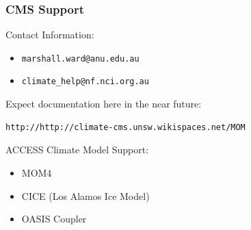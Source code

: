 \documentclass{beamer}
\begin{document}
\begin{frame}[fragile]
    \frametitle{CMS Support}
    
    Contact Information:
    \begin{itemize}
        \item \lstinline|marshall.ward@anu.edu.au|
        \item \lstinline|climate_help@nf.nci.org.au|
    \end{itemize}
    
    Expect documentation here in the near future:
    \begin{lstlisting}
http://http://climate-cms.unsw.wikispaces.net/MOM
    \end{lstlisting}
    
    ACCESS Climate Model Support:
    \begin{itemize}
        \item MOM4
        \item CICE (Los Alamos Ice Model)
        \item OASIS Coupler
    \end{itemize}
\end{frame}

\end{document}
